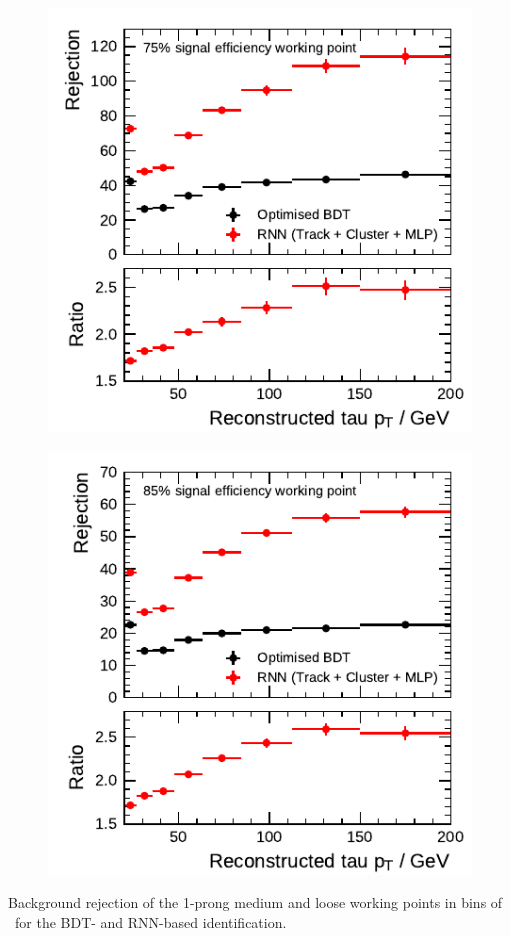 \noindent
\begin{minipage}{\textwidth}
  \captionsetup{type=figure}
  \begin{subfigure}[t]{0.48\textwidth}
    \centering
    \includegraphics{./figures/rnn/combined/rnn_medium_1p.pdf}
  \end{subfigure}\hfill
  \begin{subfigure}[t]{0.48\textwidth}
    \centering
    \includegraphics{./figures/rnn/combined/rnn_loose_1p.pdf}
  \end{subfigure}
  \caption[Background rejection of the 1-prong medium and loose working points
  in bins of \tauhadvis~\pt for the RNN-based identification]{Background
    rejection of the 1-prong medium and loose working points in bins of
    \tauhadvis~\pt for the BDT- and RNN-based identification.}
\end{minipage}

